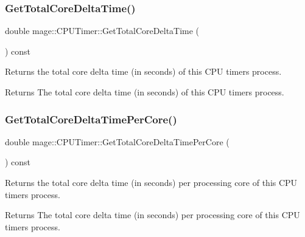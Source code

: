 \subsubsection{\texorpdfstring{Get\+Total\+Core\+Delta\+Time()}{GetTotalCoreDeltaTime()}}
{\footnotesize\ttfamily double mage\+::\+C\+P\+U\+Timer\+::\+Get\+Total\+Core\+Delta\+Time (\begin{DoxyParamCaption}{ }\end{DoxyParamCaption}) const\hspace{0.3cm}{\ttfamily [noexcept]}}

Returns the total core delta time (in seconds) of this C\+PU timer\textquotesingle{}s process.

\begin{DoxyReturn}{Returns}
The total core delta time (in seconds) of this C\+PU timer\textquotesingle{}s process. 
\end{DoxyReturn}
\hypertarget{classmage_1_1_c_p_u_timer_a283ab5a88d415390cc8c4e9139492a20}{}\label{classmage_1_1_c_p_u_timer_a283ab5a88d415390cc8c4e9139492a20} 
\subsubsection{\texorpdfstring{Get\+Total\+Core\+Delta\+Time\+Per\+Core()}{GetTotalCoreDeltaTimePerCore()}}
{\footnotesize\ttfamily double mage\+::\+C\+P\+U\+Timer\+::\+Get\+Total\+Core\+Delta\+Time\+Per\+Core (\begin{DoxyParamCaption}{ }\end{DoxyParamCaption}) const\hspace{0.3cm}{\ttfamily [noexcept]}}

Returns the total core delta time (in seconds) per processing core of this C\+PU timer\textquotesingle{}s process.

\begin{DoxyReturn}{Returns}
The total core delta time (in seconds) per processing core of this C\+PU timer\textquotesingle{}s process. 
\end{DoxyReturn}
\hypertarget{classmage_1_1_c_p_u_timer_a0642a593102eaf9aebdca5ef311f6476}{}\label{classmage_1_1_c_p_u_timer_a0642a593102eaf9aebdca5ef311f6476} 
